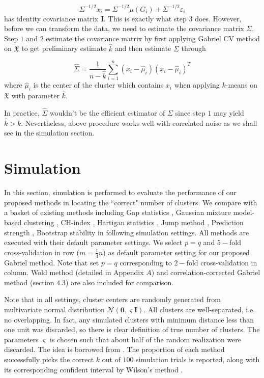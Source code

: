 \documentclass[12pt]{article}
\newcommand{\dataX}{\mathfrak{X}}
\begin{document}
\[	\Sigma^{-1/2} x_i = \Sigma^{-1/2} \mu(G_i)+\Sigma^{-1/2} \varepsilon_i \]
has identity covariance matrix $\mathbf{I}$. This is exactly what step $3$ does. However, before we can transform the data, we need to estimate the covariance matrix $\Sigma$. Step $1$ and $2$ estimate the covariance matrix by first applying Gabriel CV method on $\dataX$ to get preliminary estimate $\hat{k}$ and then estimate $\Sigma$ through

\[	\hat{\Sigma} = \frac{1}{n-\hat{k}} \sum^n_{i=1} (x_i-\hat{\mu}_i)(x_i-\hat{\mu}_i)^T	\]
where $\hat{\mu}_i$ is the center of the cluster which contains $x_i$ when applying $k$-means on $\dataX$ with parameter $\hat{k}$.  

In practice, $\hat{\Sigma}$ wouldn't be the efficient estimator of $\Sigma$ since step $1$ may yield $\hat{k} > k$. Nevertheless, above procedure works well with correlated noise as we shall see in the simulation section. 

\section{Simulation}
In this section, simulation is performed to evaluate the performance of our
proposed methods in locating the ``correct" number of clusters. We compare
with a basket of existing methods including Gap statistics
\citep{tibshirani2001estimating}, Gaussian mixture model-based clustering
\citep{fraley2002model}, CH-index \citep{calinski1974dendrite}, Hartigan
statistics \citep{hartigan1975clustering}, Jump method
\citep{sugar2003finding}, Prediction strength \citep{tibshirani2005cluster},
Bootstrap stability \citep{fang2012selection} in following simulation
settings. All methods are executed with their default parameter settings. 
We select $p=q$ and $5-$fold cross-validation in row
($m=\frac{1}{4}n$) as default parameter setting for our proposed Gabriel
method. Note that set $p=q$ corresponding to $2-$fold cross-validation in
column. Wold method (detailed in Appendix $A$) and correlation-corrected 
Gabriel method (section $4.3$) are also included for comparison. 

Note that in all settings, cluster centers are randomly generated from 
multivariate normal distribution $\mathcal{N}\left(\mathbf{0},\varsigma \mathbf{I}\right)$. 
All clusters are well-separated, i.e. no overlapping. In fact, any simulated 
clusters with minimum distance less than one unit was discarded, so there is
clear definition of true number of clusters. The parameters $\varsigma$ is chosen 
such that about half of the random realization were discarded. The idea is borrowed from
\cite{tibshirani2001estimating}. The proportion of each method successfully picks the correct
$k$ out of $100$ simulation trials is reported, along with its corresponding confident interval
by Wilson's method \citep{wilson1927probable}.
\end{document}

